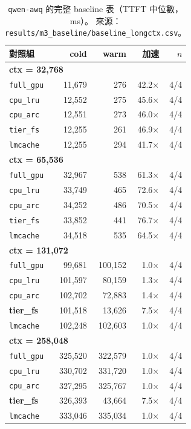 \documentclass[11pt]{article}
\begin{document}
\begin{table}[htbp]\centering\small
\caption{\texttt{qwen-awq} 的完整 baseline 表（TTFT 中位數，ms）。
來源：\texttt{results/m3\_baseline/baseline\_longctx.csv}。}
\begin{tabular}{lrrrr}
\toprule
對照組 & cold & warm & 加速 & $n$ \\
\midrule
\multicolumn{5}{l}{\textbf{ctx = 32,768}} \\
\quad \texttt{full\_gpu} & 11,679 & 276 & 42.2$\times$ & 4/4 \\
\quad \texttt{cpu\_lru} & 12,552 & 275 & 45.6$\times$ & 4/4 \\
\quad \texttt{cpu\_arc} & 12,551 & 273 & 46.0$\times$ & 4/4 \\
\quad \texttt{tier\_fs} & 12,255 & 261 & 46.9$\times$ & 4/4 \\
\quad \texttt{lmcache} & 12,255 & 294 & 41.7$\times$ & 4/4 \\
\multicolumn{5}{l}{\textbf{ctx = 65,536}} \\
\quad \texttt{full\_gpu} & 32,967 & 538 & 61.3$\times$ & 4/4 \\
\quad \texttt{cpu\_lru} & 33,749 & 465 & 72.6$\times$ & 4/4 \\
\quad \texttt{cpu\_arc} & 34,252 & 486 & 70.5$\times$ & 4/4 \\
\quad \texttt{tier\_fs} & 33,852 & 441 & 76.7$\times$ & 4/4 \\
\quad \texttt{lmcache} & 34,518 & 535 & 64.5$\times$ & 4/4 \\
\multicolumn{5}{l}{\textbf{ctx = 131,072}} \\
\quad \texttt{full\_gpu} & 99,681 & 100,152 & 1.0$\times$ & 4/4 \\
\quad \texttt{cpu\_lru} & 101,597 & 80,159 & 1.3$\times$ & 4/4 \\
\quad \texttt{cpu\_arc} & 102,702 & 72,883 & 1.4$\times$ & 4/4 \\
\quad \textbf{tier\_fs} & 101,518 & 13,626 & 7.5$\times$ & 4/4 \\
\quad \texttt{lmcache} & 102,248 & 102,603 & 1.0$\times$ & 4/4 \\
\multicolumn{5}{l}{\textbf{ctx = 258,048}} \\
\quad \texttt{full\_gpu} & 325,520 & 322,579 & 1.0$\times$ & 4/4 \\
\quad \texttt{cpu\_lru} & 330,702 & 331,720 & 1.0$\times$ & 4/4 \\
\quad \texttt{cpu\_arc} & 327,295 & 325,767 & 1.0$\times$ & 4/4 \\
\quad \textbf{tier\_fs} & 326,393 & 43,664 & 7.5$\times$ & 4/4 \\
\quad \texttt{lmcache} & 333,046 & 335,034 & 1.0$\times$ & 4/4 \\
\bottomrule
\end{tabular}
\end{table}
\end{document}

